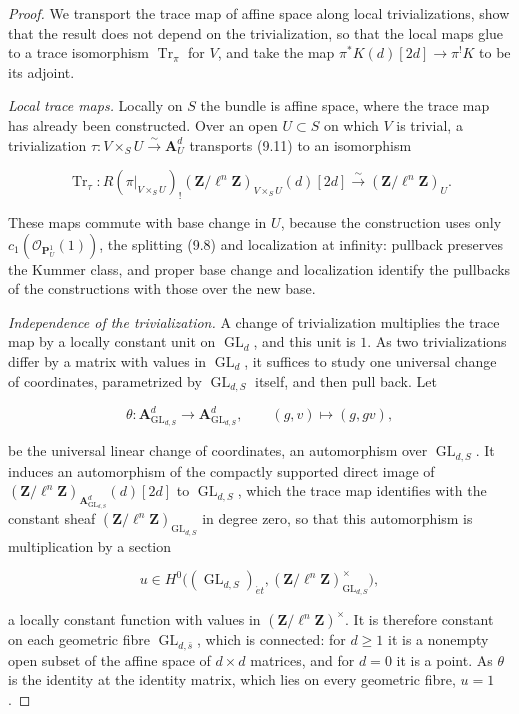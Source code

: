 \documentclass[11pt]{article}
\providecommand{\GL}{}\renewcommand{\GL}{\operatorname{GL}}
\begin{document}
\begin{proof}[{Proof}]\label{bp22}%
We transport the trace map of affine space along local trivializations, show that the result does not depend on the trivialization, so that the local maps glue to a trace isomorphism \(\operatorname{Tr}_\pi\) for \(V\), and take the map \(\pi^*K(d)[2d]\to\pi^!K\) to be its adjoint.

\emph{Local trace maps.} Locally on \(S\) the bundle is affine space, where the trace map has already been constructed. Over an open \(U\subset S\) on which \(V\) is trivial, a trivialization \(\tau:V\times_S U\xrightarrow{\sim}\mathbf A^d_U\) transports (9.11) to an isomorphism

\[
\operatorname{Tr}_{\tau}:
R(\pi|_{V\times_S U})_!(\mathbf Z/\ell^n\mathbf Z)_{V\times_S U}(d)[2d]
\xrightarrow{\sim}(\mathbf Z/\ell^n\mathbf Z)_U.
\]

These maps commute with base change in \(U\), because the construction uses only \(c_1(\mathcal O_{\mathbf P^1_U}(1))\), the splitting (9.8) and localization at infinity: pullback preserves the Kummer class, and proper base change and localization identify the pullbacks of the constructions with those over the new base.

\emph{Independence of the trivialization.} A change of trivialization multiplies the trace map by a locally constant unit on \(\GL_d\), and this unit is \(1\). As two trivializations differ by a matrix with values in \(\GL_d\), it suffices to study one universal change of coordinates, parametrized by \(\GL_{d,S}\) itself, and then pull back. Let

\[
\theta:\mathbf A^d_{\GL_{d,S}}\longrightarrow\mathbf A^d_{\GL_{d,S}},
\qquad (g,v)\longmapsto(g,gv),
\]

be the universal linear change of coordinates, an automorphism over \(\GL_{d,S}\). It induces an automorphism of the compactly supported direct image of \((\mathbf Z/\ell^n\mathbf Z)_{\mathbf A^d_{\GL_{d,S}}}(d)[2d]\) to \(\GL_{d,S}\), which the trace map identifies with the constant sheaf \((\mathbf Z/\ell^n\mathbf Z)_{\GL_{d,S}}\) in degree zero, so that this automorphism is multiplication by a section

\[
u\in H^0\bigl((\GL_{d,S})_{\acute{e}t},
(\mathbf Z/\ell^n\mathbf Z)_{\GL_{d,S}}^{\times}\bigr),
\]

a locally constant function with values in \((\mathbf Z/\ell^n\mathbf Z)^{\times}\). It is therefore constant on each geometric fibre \(\GL_{d,\bar s}\), which is connected: for \(d\geq1\) it is a nonempty open subset of the affine space of \(d\times d\) matrices, and for \(d=0\) it is a point. As \(\theta\) is the identity at the identity matrix, which lies on every geometric fibre, \(u=1\).


\end{proof}
\end{document}
